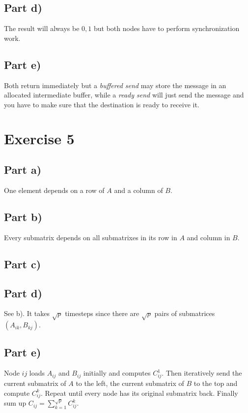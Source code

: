 \documentclass[10pt,a4paper]{article}
\begin{document}
\subsection*{Part d)}

The result will always be $0, 1$ but both nodes have to perform synchronization work.

\subsection*{Part e)}

Both return immediately but a \emph{buffered send} may store the message in an allocated intermediate buffer, while a \emph{ready send} will just send the message and you have to make sure that the destination is ready to receive it.

\section*{Exercise 5}

\subsection*{Part a)}

One element depends on a row of $A$ and a column of $B$.

\subsection*{Part b)}

Every submatrix depends on all submatrixes in its row in $A$ and column in $B$.

\subsection*{Part c)}

\subsection*{Part d)}

See b).
It takes $\sqrt{p}$ timesteps since there are $\sqrt{p}$ pairs of submatrices $(A_{ik}, B_{kj})$.

\subsection*{Part e)}

Node $ij$ loads $A_{ij}$ and $B_{ij}$ initially and computes $C_{ij}^{1}$.
Then iteratively send the current submatrix of $A$ to the left, the current submatrix of $B$ to the top and compute $C_{ij}^{k}$.
Repeat until every node has its original submatrix back.
Finally sum up $C_{ij} = \sum_{k = 1}^{\sqrt{p}} C_{ij}^{k}$.
\end{document}
